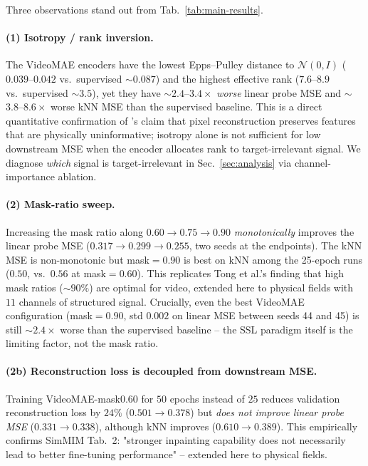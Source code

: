 \documentclass{article}
\begin{document}
Three observations stand out from Tab.~\ref{tab:main-results}.

\paragraph{(1) Isotropy / rank inversion.} The VideoMAE encoders have the
lowest Epps--Pulley distance to $\mathcal{N}(0,I)$ ($0.039$--$0.042$ vs.\
supervised $\sim$$0.087$) and the highest effective rank ($7.6$--$8.9$ vs.\
supervised $\sim$$3.5$), yet they have $\sim$$2.4$--$3.4{\times}$ \emph{worse}
linear probe MSE and $\sim$$3.8$--$8.6{\times}$ worse kNN MSE than the
supervised baseline. This is a direct quantitative confirmation of
\citet{qu2026spatiotemporal}'s claim that pixel reconstruction preserves
features that are physically uninformative; isotropy alone is not sufficient
for low downstream MSE when the encoder allocates rank to target-irrelevant
signal. We diagnose \emph{which} signal is target-irrelevant in
Sec.~\ref{sec:analysis} via channel-importance ablation.

\paragraph{(2) Mask-ratio sweep.} Increasing the mask ratio along $0.60 \to
0.75 \to 0.90$ \emph{monotonically} improves the linear probe MSE ($0.317 \to
0.299 \to 0.255$, two seeds at the endpoints). The kNN MSE is non-monotonic
but mask$=0.90$ is best on kNN among the 25-epoch runs ($0.50$, vs.\ $0.56$
at mask$=0.60$). This replicates Tong et al.'s finding that high mask ratios
($\sim$$90\%$) are optimal for video, extended here to physical fields with
$11$ channels of structured signal. Crucially, even the best VideoMAE
configuration (mask$=0.90$, std $0.002$ on linear MSE between seeds 44 and 45)
is still $\sim$$2.4{\times}$ worse than the supervised baseline -- the SSL
paradigm itself is the limiting factor, not the mask ratio.

\paragraph{(2b) Reconstruction loss is decoupled from downstream MSE.}
Training VideoMAE-mask$0.60$ for $50$ epochs instead of $25$ reduces validation
reconstruction loss by $24\%$ ($0.501 \to 0.378$) but \emph{does not improve
linear probe MSE} ($0.331 \to 0.338$), although kNN improves ($0.610 \to
0.389$). This empirically confirms SimMIM Tab.~2: "stronger inpainting
capability does not necessarily lead to better fine-tuning performance" --
extended here to physical fields.
\end{document}
